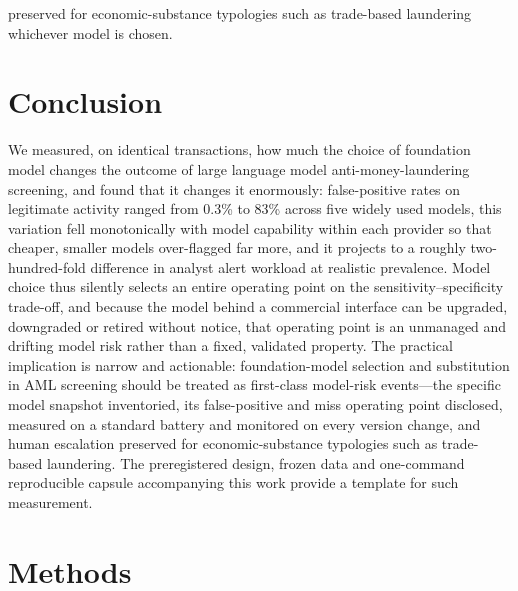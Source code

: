 \documentclass[lineno,pdflatex,sn-basic,Numbered]{sn-jnl}
\begin{document}
preserved for economic-substance typologies such as trade-based laundering whichever model is chosen.

\section{Conclusion}\label{sec:conclusion}

We measured, on identical transactions, how much the choice of foundation model changes the outcome of large language model anti-money-laundering screening, and found that it changes it enormously: false-positive rates on legitimate activity ranged from 0.3\% to 83\% across five widely used models, this variation fell monotonically with model capability within each provider so that cheaper, smaller models over-flagged far more, and it projects to a roughly two-hundred-fold difference in analyst alert workload at realistic prevalence. Model choice thus silently selects an entire operating point on the sensitivity--specificity trade-off, and because the model behind a commercial interface can be upgraded, downgraded or retired without notice, that operating point is an unmanaged and drifting model risk rather than a fixed, validated property. The practical implication is narrow and actionable: foundation-model selection and substitution in AML screening should be treated as first-class model-risk events---the specific model snapshot inventoried, its false-positive and miss operating point disclosed, measured on a standard battery and monitored on every version change, and human escalation preserved for economic-substance typologies such as trade-based laundering. The preregistered design, frozen data and one-command reproducible capsule accompanying this work provide a template for such measurement.

\section{Methods}\label{sec:methods}
\end{document}
